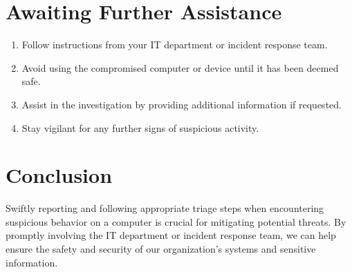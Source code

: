 \documentclass{article}
\begin{document}
\section{Awaiting Further Assistance}
\begin{enumerate}
    \item Follow instructions from your IT department or incident response team.
    \item Avoid using the compromised computer or device until it has been deemed safe.
    \item Assist in the investigation by providing additional information if requested.
    \item Stay vigilant for any further signs of suspicious activity.
\end{enumerate}

\section{Conclusion}
Swiftly reporting and following appropriate triage steps when encountering suspicious behavior on a computer is crucial for mitigating potential threats. By promptly involving the IT department or incident response team, we can help ensure the safety and security of our organization's systems and sensitive information.
\end{document}
